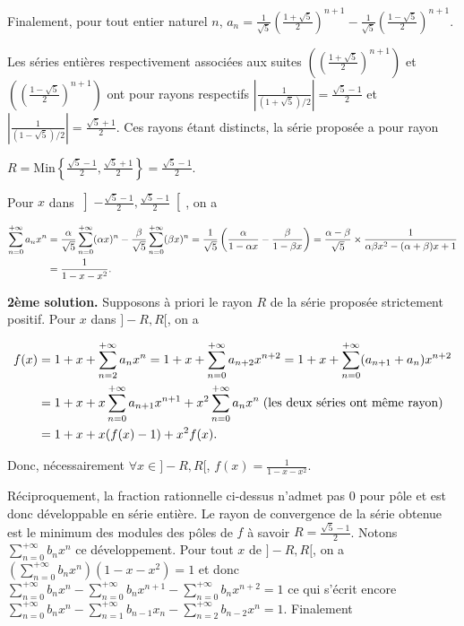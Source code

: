 {{Finalement, pour tout entier naturel $n$, $a_n =\frac{1}{\sqrt{5}}\left(\frac{1+\sqrt{5}}{2}\right)^{n+1}-\frac{1}{\sqrt{5}}\left(\frac{1-\sqrt{5}}{2}\right)^{n+1}$.

Les séries entières respectivement associées aux suites $\left(\left(\frac{1+\sqrt{5}}{2}\right)^{n+1}\right)$ et $\left(\left(\frac{1-\sqrt{5}}{2}\right)^{n+1}\right)$ ont pour rayons respectifs $\left|\frac{1}{(1+\sqrt{5})/2}\right|=\frac{\sqrt{5}-1}{2}$ et $\left|\frac{1}{(1-\sqrt{5})/2}\right|=\frac{\sqrt{5}+1}{2}$. Ces rayons étant distincts, la série proposée a pour rayon

\begin{center}
$R=\text{Min}\left\{\frac{\sqrt{5}-1}{2},\frac{\sqrt{5}+1}{2}\right\}=\frac{\sqrt{5}-1}{2}$.
\end{center}

Pour $x$ dans $\left]-\frac{\sqrt{5}-1}{2},\frac{\sqrt{5}-1}{2}\right[$, on a

\begin{align*}\ensuremath
\sum_{n=0}^{+\infty}a_nx^n&=\frac{\alpha}{\sqrt{5}}\sum_{n=0}^{+\infty}(\alpha x)^n -\frac{\beta}{\sqrt{5}}\sum_{n=0}^{+\infty}(\beta x)^n
=\frac{1}{\sqrt{5}}\left(\frac{\alpha}{1-\alpha x}-\frac{\beta}{1-\beta x}\right)
=\frac{\alpha-\beta}{\sqrt{5}}\times\frac{1}{\alpha\beta x^2-(\alpha+\beta)x+1}\\
 &=\frac{1}{1-x-x^2}.
\end{align*}

\textbf{2ème solution.} Supposons à priori le rayon $R$ de la série proposée strictement positif. Pour $x$ dans $]-R,R[$, on a

\begin{align*}\ensuremath
f(x)&= 1+ x +\sum_{n=2}^{+\infty}a_nx^n= 1 + x +\sum_{n=0}^{+\infty}a_{n+2}x^{n+2}=1+x+\sum_{n=0}^{+\infty}(a_{n+1}+a_n)x^{n+2}\\
 &= 1 + x + x\sum_{n=0}^{+\infty}a_{n+1}x^{n+1}+ x^2\sum_{n=0}^{+\infty}a_nx^n\;(\text{les deux séries ont même rayon})\\ 
 &=1+x+x(f(x)-1)+ x^2 f(x).
\end{align*}

Donc, nécessairement $\forall x\in]-R,R[$, $f(x) =\frac{1}{1-x-x^2}$.

Réciproquement, la fraction rationnelle ci-dessus n'admet pas $0$ pour pôle et est donc développable en série entière. Le rayon de convergence de la série obtenue est le minimum des modules des pôles de $f$ à savoir $R=\frac{\sqrt{5}-1}{2}$. Notons $\sum_{n=0}^{+\infty}b_nx^n$ ce développement. Pour tout $x$ de $]-R,R[$, on a $\left(\sum_{n=0}^{+\infty}b_nx^n\right)(1-x-x^2)=1$ et donc $\sum_{n=0}^{+\infty}b_nx^n -\sum_{n=0}^{+\infty}b_nx^{n+1}-\sum_{n=0}^{+\infty}b_nx^{n+2}= 1$ ce qui s'écrit encore  $\sum_{n=0}^{+\infty}b_nx^n-\sum_{n=1}^{+\infty}b_{n-1}x_n -\sum_{n=2}^{+\infty}b_{n-2}x^n = 1$. Finalement 

}}

